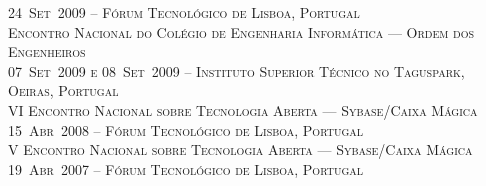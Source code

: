 \documentclass[a4paper,fontsize=10pt]{scrartcl} %
\begin{document}
\begin{minipage}[t]{0.46\textwidth}
\small\textsc{24~Set~2009 -- Fórum Tecnológico de Lisboa, Portugal}\\ \normalsize
\textsc{Encontro Nacional do Colégio de Engenharia Informática --- Ordem dos Engenheiros}\\
\small\textsc{07~Set~2009 e 08~Set~2009 -- Instituto Superior Técnico no Taguspark, Oeiras, Portugal}\\ \normalsize
\textsc{VI Encontro Nacional sobre Tecnologia Aberta --- Sybase/Caixa Mágica}\\
\small\textsc{15~Abr~2008 -- Fórum Tecnológico de Lisboa, Portugal}\\ \normalsize
\textsc{V Encontro Nacional sobre Tecnologia Aberta --- Sybase/Caixa Mágica}\\
\small\textsc{19~Abr~2007 -- Fórum Tecnológico de Lisboa, Portugal}\\ \normalsize
\end{minipage} %
\end{document}
